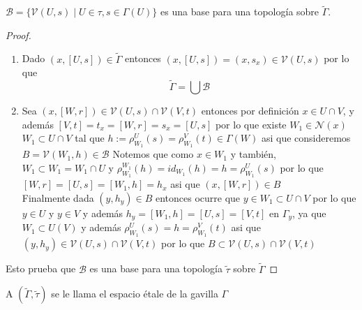 \documentclass[14pt]{extarticle}
\begin{document}
\begin{proposicion}{}{}
    $\mathcal{B}=\{\mathcal{V}(U,s)\mid U\in\tau, s\in \Gamma(U)\}$
    es una base para una topología sobre $\widetilde{\Gamma}$.
\end{proposicion}
\begin{proof}
    \begin{enumerate}
        \item Dado $(x,[U,s])\in \widetilde{\Gamma}$
        entonces $(x,[U,s])=(x,s_x)\in \mathcal{V}(U,s)$
        por lo que 
        $$\widetilde{\Gamma}=\bigcup \mathcal{B}$$
        \item Sea $(x,[W,r])\in \mathcal{V}(U,s)\cap \mathcal{V}(V,t)$
        entonces por definición $x \in U\cap V$,
        y además $[V,t]=t_x=[W,r]=s_x=[U,s]$
        por lo que existe $W_1\in \mathcal{N}(x)$
        $W_1\subset U\cap V$ tal que
        $h:=\rho_{W_1}^{U}(s)=\rho_{W_1}^{V}(t)\in \Gamma(W)$
        asi que consideremos $B = \mathcal{V}(W_1, h)\in \mathcal{B}$
        Notemos que como $x\in W_1$ y también, 
        $W_1\subset W_1=W_1\cap U$ y 
        $\rho_{W_1}^{W_1}(h)=id_{W_1}(h)=h=\rho_{W_1}^{U}(s)$
        por lo que $[W,r]=[U,s]=[W_1,h]=h_x$
        asi que $(x,[W,r])\in B$\\
        Finalmente dada $(y,h_y)\in B$ entonces ocurre que 
        $y\in W_1 \subset U\cap V$ por lo que $y\in U$ y 
        $y\in V$ y además $h_y=[W_1, h]=[U,s]=[V,t]$ en $\Gamma_y$, ya que
        $W_1\subset U ( V )$ y además $\rho_{W_1}^{U}(s)=h=\rho_{W_1}^{V}(t)$
        asi que $(y,h_y)\in \mathcal{V}(U,s)\cap \mathcal{V}(V,t)$
        por lo que $B \subset \mathcal{V}(U,s)\cap \mathcal{V}(V,t)$
    \end{enumerate}
    Esto prueba que $\mathcal{B}$ es una base 
    para una topología $\tilde{\tau}$ sobre $\widetilde{\Gamma}$
\end{proof}

\begin{definicion}{}{}
    A $(\widetilde{\Gamma},\tilde{\tau})$
    se le llama el espacio étale de la gavilla 
    $\Gamma$
\end{definicion}
\end{document}
